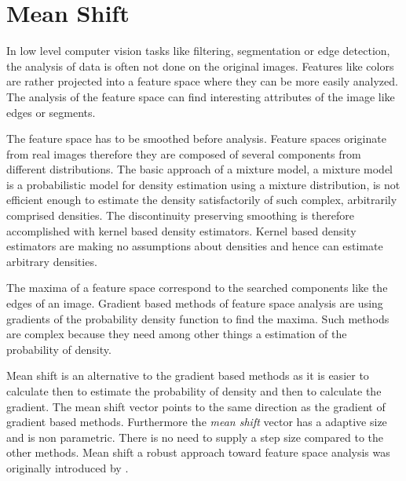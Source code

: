 \chapter{Mean Shift}\label{ch:mean_shift}
In low level computer vision tasks like filtering, segmentation or edge
detection, the analysis of data is often not done on the original images.
Features like colors are rather projected into a feature space where they can be
more easily analyzed. The analysis of the feature space can find interesting
attributes of the image like edges or segments.

The feature space has to be smoothed before analysis. Feature spaces originate
from real images therefore they are composed of several components from
different distributions. The basic approach of a mixture model, a mixture model
is a probabilistic model for density estimation using a mixture distribution, is
not efficient enough to estimate the density satisfactorily of such complex,
arbitrarily comprised densities. The discontinuity preserving smoothing is therefore
accomplished with kernel based density estimators. Kernel based density estimators
are making no assumptions about densities and hence can estimate arbitrary 
densities.

The maxima of a feature space correspond to the searched components like the
edges of an image. Gradient based methods of feature space analysis are using
gradients of the probability density function to find the maxima. Such methods
are complex because they need among other things a estimation of the probability
of density.

Mean shift is an alternative to the gradient based methods as it is easier to
calculate then to estimate the probability of density and then to calculate the
gradient. The mean shift vector points to the same direction as the gradient of
gradient based methods. Furthermore the \emph{mean shift} vector has a adaptive
size and is non parametric. There is no need to supply a step size compared to
the other methods. Mean shift a robust approach toward feature space analysis
was originally introduced by \citeauthor{citeulike:462300}
\citep{citeulike:462300}.

